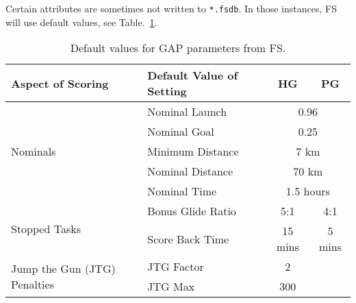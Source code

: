 \documentclass[gap.tex]{subfiles}
\begin{document}
Certain attributes are sometimes not written to \texttt{*.fsdb}. In those
instances, FS will use default values, see Table.~\ref{tab:gap-defaults}.

\begin{table}[!ht]
    \begin{tabularx}{\textwidth}{|X|l|c|c|}
    \hline
        Aspect of Scoring
        & Default Value of Setting
        & HG
        & PG
        \\
    \hline
        \multirow{5}{*}{Nominals}
        & Nominal Launch
        & \multicolumn{2}{c|}{0.96}
        \\
    \cline{2-4}
        & Nominal Goal
        & \multicolumn{2}{c|}{0.25}
        \\
    \cline{2-4}
        & Minimum Distance
        & \multicolumn{2}{c|}{7 km}
        \\
    \cline{2-4}
        & Nominal Distance
        & \multicolumn{2}{c|}{70 km}
        \\
    \cline{2-4}
        & Nominal Time
        & \multicolumn{2}{c|}{1.5 hours}
        \\
    \hline
        \multirow{2}{*}{Stopped Tasks}
        & Bonus Glide Ratio
        & 5:1
        & 4:1
        \\
    \cline{2-4}
        & Score Back Time
        & 15 mins
        & 5 mins
        \\
    \hline
        \multirow{2}{*}{Jump the Gun (JTG) Penalties}
        & JTG Factor 
        & 2
        &
        \\
    \cline{2-4}
        & JTG Max
        & 300
        &
        \\
    \hline
    \end{tabularx}
    \caption{Default values for GAP parameters from FS.}
    \label{tab:gap-defaults}
\end{table}
\end{document}
